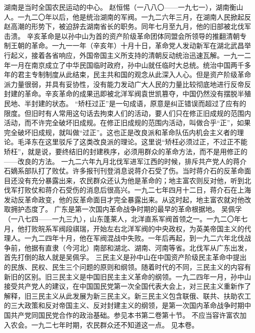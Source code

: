 \begin{maonote}
湖南是当时全国农民运动的中心。
赵恒惕（一八八〇——一九七一），湖南衡山人。一九二〇年以后，他是统治湖南的军阀。一九二六年三月，在湖南人民掀起反赵高潮的形势下，被迫辞去湖南省长的职务。同年七月至九月，他的旧部被北伐军击溃。
辛亥革命是以孙中山为首的资产阶级革命团体同盟会所领导的推翻清朝专制王朝的革命。一九一一年（辛亥年）十月十日，革命党人发动新军在湖北武昌举行起义，接着各省响应，外国帝国主义所支持的清朝反动统治迅速瓦解。一九一二年一月在南京成立了中华民国临时政府，孙中山就任临时大总统。统治中国两千多年的君主专制制度从此结束，民主共和国的观念从此深入人心。但是资产阶级革命派力量很弱，并具有妥协性，没有能力发动广大人民的力量比较彻底地进行反帝反封建的革命。辛亥革命的成果迅即被北洋军阀袁世凯篡夺，中国仍然没有摆脱半殖民地、半封建的状态。
“矫枉过正”是一句成语，原意是纠正错误而超过了应有的限度。但旧时有人常用这句话去拘束人们的活动，要人们只在修正旧成规的范围内活动，而不许完全破坏旧成规。在修正旧成规的范围内活动，叫做合乎“正”，如果完全破坏旧成规，就叫做“过正”。这也正是改良派和革命队伍内机会主义者的理论。毛泽东在这里驳斥了这类改良派的理论。这里说“矫枉必须过正，不过正不能矫枉”，就是说，要终结旧的封建秩序，必须用群众的革命方法，而不是用修正的——改良的方法。
一九二六年九月北伐军进军江西的时候，排斥共产党人的蒋介石嫡系部队打了败仗。许多报刊刊登消息说蒋介石受了伤。当时蒋介石的反革命面目还没有充分暴露出来，农民群众还认为他是革命的；地主富农则反对他，听到北伐军打败仗和蒋介石受伤的消息后很高兴。一九二七年四月十二日，蒋介石在上海发动反革命政变，他的反革命面目才完全暴露出来。从这时起，地主富农就对他改取拥护态度了。
广东是第一次国内革命战争时期的最早的革命根据地。
吴佩孚（一八七四——一九三九），山东蓬莱人，北洋直系军阀首领之一。一九二〇年七月，他打败皖系军阀段祺瑞，开始左右北洋军阀的中央政权，为英美帝国主义的代理人。一九二四年十月，他在军阀混战中失败。一年后再起，到一九二六年北伐战争前，他据有直隶（今河北）南部和湖北、湖南、河南等省。北伐军从广东出发，首先打倒的敌人就是吴佩孚。
三民主义是孙中山在中国资产阶级民主革命中提出的民族、民权、民生三个问题的原则和纲领。随着时代的不同，三民主义的内容有新旧的区别。旧三民主义是中国旧民主主义革命的纲领。一九二四年一月，孙中山接受共产党人的建议，在中国国民党第一次全国代表大会上，对三民主义重新作了解释，旧三民主义从此发展为新三民主义。新三民主义包含联俄、联共、扶助农工的三大政策和反对帝国主义、反对封建主义的纲领，是第一次国内革命战争时期中国共产党同国民党合作的政治基础。参见本书第二卷第十节。
不应当容许富农加入农会。一九二七年时期，农民群众还不知道这一点。
见本卷。

\end{maonote}
